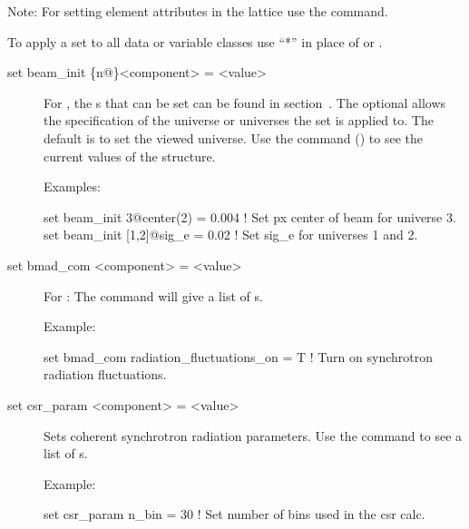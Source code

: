 {{\vskip 0.2in 
Note: For setting element attributes in the 
lattice use the  command.

To apply a set to all data or variable classes use ``*''
in place of  or .



\begin{description}

\item[set beam\_init \{n@\}<component> = <value>] \Newline
For , the s that can be set can be
found in section~. The optional  allows the
specification of the universe or universes the set is applied to. The
default is to set the viewed universe. Use the  command
() to see the current values of the 
structure.

Examples:
\begin{example}
  set beam_init 3@center(2) = 0.004  ! Set px center of beam for universe 3.
  set beam_init [1,2]@sig_e = 0.02   ! Set sig_e for universes 1 and 2.
\end{example}


\item[set bmad_com <component> = <value>] \Newline
For : The  command will give a list of 
s.

Example:
\begin{example}
  set bmad_com radiation_fluctuations_on = T ! Turn on synchrotron radiation fluctuations.
\end{example}


\item[set csr_param <component> = <value>] \Newline
Sets coherent synchrotron radiation parameters. Use the  command to see a list of s.

Example:
\begin{example}
  set csr_param n_bin = 30  ! Set number of bins used in the csr calc.
\end{example}


\end{description}}}
